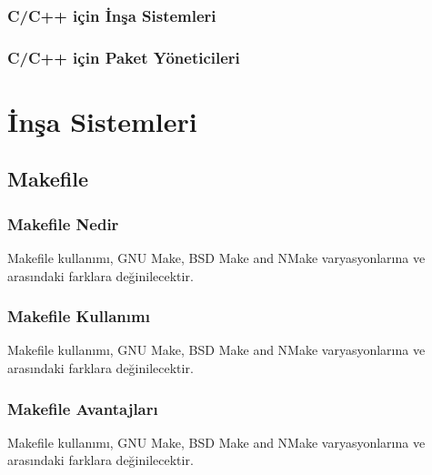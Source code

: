 \documentclass[
]{book}
\begin{document}
\hypertarget{cc-iuxe7in-inux15fa-sistemleri}{%
\section*{C/C++ için İnşa Sistemleri}\label{cc-iuxe7in-inux15fa-sistemleri}}

\hypertarget{cc-iuxe7in-paket-yuxf6neticileri}{%
\section*{C/C++ için Paket Yöneticileri}\label{cc-iuxe7in-paket-yuxf6neticileri}}

\hypertarget{part-inux15fa-sistemleri}{%
\part{İnşa Sistemleri}\label{part-inux15fa-sistemleri}}

\hypertarget{makefile}{%
\chapter{Makefile}\label{makefile}}

\hypertarget{makefile-nedir}{%
\section{Makefile Nedir}\label{makefile-nedir}}

Makefile kullanımı, GNU Make, BSD Make and NMake varyasyonlarına ve arasındaki farklara değinilecektir.

\hypertarget{makefile-kullanux131mux131}{%
\section{Makefile Kullanımı}\label{makefile-kullanux131mux131}}

Makefile kullanımı, GNU Make, BSD Make and NMake varyasyonlarına ve arasındaki farklara değinilecektir.

\hypertarget{makefile-avantajlarux131}{%
\section{Makefile Avantajları}\label{makefile-avantajlarux131}}

Makefile kullanımı, GNU Make, BSD Make and NMake varyasyonlarına ve arasındaki farklara değinilecektir.
\end{document}
